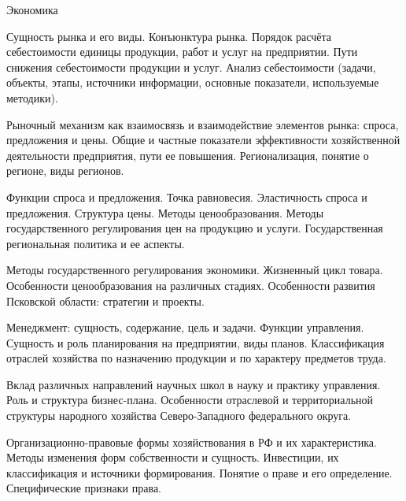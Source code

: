\documentclass[
	11pt,
	a4paper,
	]
	{article}
\begin{document}
 {Экономика}

	

\noindent{} 
	{
		Сущность рынка и его виды. Конъюнктура рынка.
	}{
		Порядок расчёта себестоимости единицы продукции, работ и услуг на предприятии. Пути снижения себестоимости продукции и услуг.
	}{
		Анализ себестоимости (задачи, объекты, этапы, источники информации, основные показатели, используемые методики).
	}

\bigskip

\noindent{} 
	{
		Рыночный механизм как взаимосвязь и взаимодействие элементов рынка: спроса, предложения и цены.
	}{
		Общие и частные показатели эффективности хозяйственной деятельности предприятия, пути ее повышения.
	}{
		Регионализация, понятие о регионе, виды регионов.
	}

\bigskip

\noindent{} 
	{
		Функции спроса и предложения. Точка равновесия. Эластичность спроса и предложения.
	}{
		Структура цены. Методы ценообразования. Методы государственного регулирования цен на продукцию и услуги.
	}{
		Государственная региональная политика и ее аспекты.
	}

\bigskip

\noindent{} 
	{
		Методы государственного регулирования экономики.
	}{
		Жизненный цикл товара. Особенности ценообразования на различных стадиях.
	}{
		Особенности развития Псковской области: стратегии и проекты.
	}

\bigskip

\noindent{} 
	{
		Менеджмент: сущность, содержание, цель и задачи. Функции управления.
	}{
		Сущность и роль планирования на предприятии, виды планов.
	}{
		Классификация отраслей хозяйства по назначению продукции и по характеру предметов труда.
	}

\bigskip

\noindent{} 
	{
		Вклад различных направлений научных школ в науку и практику управления.
	}{
		Роль и структура бизнес-плана.
	}{
		Особенности отраслевой и территориальной структуры народного хозяйства Северо-Западного федерального округа.
	}

\bigskip

\noindent{} 
	{
		Организационно-правовые формы хозяйствования в РФ и их характеристика. Методы изменения форм собственности и сущность.
	}{
		Инвестиции, их классификация и источники формирования.
	}{
		Понятие о праве и его определение. Специфические признаки права.
	}
\end{document}
